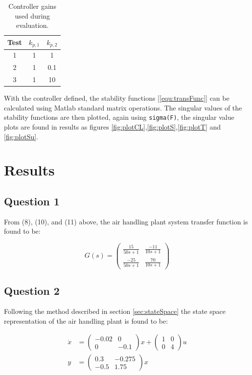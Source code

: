 \documentclass[a4paper, titlepage]{article}
\begin{document}
\begin{table}[h!]
\begin{center}
\begin{tabular}{||c | c c||}
 \hline
 Test & $k_{p,1}$ & $k_{p,2}$ \\ [0.5ex] 
 \hline\hline
 1 &  1 & 1 \\ 
 \hline
 2 &  1 & 0.1 \\
 \hline
 3 &  1 & 10 \\
 \hline
\end{tabular}
\end{center}
\caption{Controller gains used during evaluation.}
\label{tab:gains}
\end{table}

With the controller defined, the stability functions [\ref{equ:transFunc}] can be calculated using Matlab standard matrix operations.
The singular values of the stability functions are then plotted, again using \verb|sigma(F)|, the singular value plots are found in results as figures \ref{fig:plotCL},\ref{fig:plotS},\ref{fig:plotT} and \ref{fig:plotSu}.

\section{Results}

\subsection{Question 1}
From (8), (10), and (11) above, the air handling plant system transfer function is found to be:

\begin{equation}
G(s)
=
\begin{pmatrix}
\frac{15}{50s + 1} 	& 	\frac{-11}{10s + 1} \\[6pt]
\frac{-25}{50s + 1} 	& 	\frac{70}{10s + 1}
\end{pmatrix}
\label{equ:airPlantResult}
\end{equation}

\subsection{Question 2}
Following the method described in section \ref{sec:stateSpace} the state space representation of the air handling plant is found to be:

\begin{equation}
\begin{split}
\dot{x} &= 
\begin{pmatrix}
-0.02 & 0 \\ 0 & -0.1
\end{pmatrix}x
+
\begin{pmatrix}
1 & 0 \\ 0 & 4
\end{pmatrix}u \\
y &= 
\begin{pmatrix}
0.3 & -0.275 \\ -0.5 & 1.75
\end{pmatrix}x
\end{split}
\label{equ:ssSolution}
\end{equation}
\end{document}
